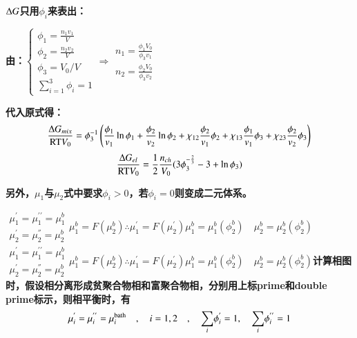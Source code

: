 \documentclass{article} %
\begin{document}
{\bf ${\rm \Delta }G$只用$\phi _{i} $来表出：}

\noindent 
{\bf 由：$\left\{\begin{array}{c} {\phi _{1} =\frac{n_{1} v_{1} }{V} } \\ {\phi _{2} =\frac{n_{2} v_{2} }{V} } \\ {\phi _{3} =V_{0} /V} \\ {\mathop{\sum }\limits_{i=1}^{3} \phi _{i} =1} \end{array}\right. \Rightarrow \begin{array}{c} {n_{1} =\frac{\phi _{1} V_{0} }{\phi _{3} v_{1} } } \\ {n_{2} =\frac{\phi _{2} V_{0} }{\phi _{3} v_{2} } } \end{array}$ }

\noindent 
{\bf 代入原式得：
\[\frac{{\rm \Delta }G_{mix} }{{\rm RT}V_{0} } =\phi _{3}^{-1} \left(\frac{\phi _{1} }{v_{1} } \ln \phi _{1} +\frac{\phi _{2} }{v_{2} } \ln \phi _{2} +\chi _{12} \frac{\phi _{2} }{v_{1} } \phi _{2} +\chi _{13} \frac{\phi _{1} }{v_{1} } \phi _{3} +\chi _{23} \frac{\phi _{2} }{v_{2} } \phi _{3} \right)\] 
\[\frac{{\rm \Delta }G_{el} }{{\rm RT}V_{0} } =\frac{1}{2} \frac{n_{ch} }{V_{0} } (3\phi _{3}^{-\frac{2}{3} } -3+\ln \phi _{3} )\] }

{\bf 另外，$\mu _{1} $与$\mu _{2} $式中要求$\phi _{i} >0$，若$\phi _{i} =0$则变成二元体系。}


{\bf  $\begin{array}{c} {\mu _{1}^{{'} } =\mu _{1}^{{'} {'} } =\mu _{1}^{b} } \\ {\mu _{2}^{{'} } =\mu _{2}^{''} =\mu _{2}^{b} } \end{array}$$\mu _{1}^{b} =F(\mu _{2}^{b} )\therefore \mu _{1}^{{'} } =F(\mu _{2}^{{'} } )$$\mu _{1}^{b} =\mu _{1}^{b} (\phi _{2}^{b} )\quad \mu _{2}^{b} =\mu _{2}^{b} (\phi _{2}^{b} )$$\begin{array}{c} {\mu _{1}^{{'} } =\mu _{1}^{{'} {'} } =\mu _{1}^{b} } \\ {\mu _{2}^{{'} } =\mu _{2}^{''} =\mu _{2}^{b} } \end{array}$$\mu _{1}^{b} =F(\mu _{2}^{b} )\therefore \mu _{1}^{{'} } =F(\mu _{2}^{{'} } )$$\mu _{1}^{b} =\mu _{1}^{b} (\phi _{2}^{b} )\quad \mu _{2}^{b} =\mu _{2}^{b} (\phi _{2}^{b} )$计算相图时，假设相分离形成贫聚合物相和富聚合物相，分别用上标prime和double prime标示，则相平衡时，有
\[\mu _{i}^{{'} } =\mu _{i}^{{'} {'} } =\mu _{i}^{{\rm bath}} \quad ,\quad i=1,2\quad ,\quad {\mathop{\sum }\limits_{i}} \phi _{i}^{{'} } =1,\quad {\mathop{\sum }\limits_{i}} \phi _{i}^{{'} {'} } =1\] }
\end{document}
